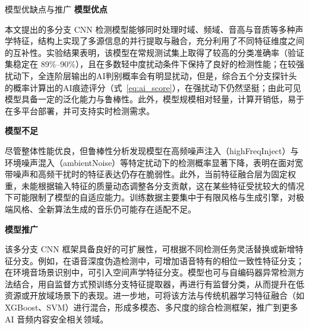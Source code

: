 \documentclass[aspectratio=169]{beamer}
\providecommand{\paragraph}[1]{\smallskip\textbf{#1}\par}
\begin{document}
\begin{frame}{模型优缺点与推广}
\small
\paragraph{模型优点} 
本文提出的多分支 CNN 检测模型能够同时处理时域、频域、音高与音质等多种声学特征，结构上实现了多源信息的并行提取与融合，充分利用了不同特征维度之间的互补性。实验结果表明，该模型在常规测试集上取得了较高的分类准确率（验证集稳定在 89\%--90\%），且在多数轻中度扰动条件下保持了良好的检测性能；在较强扰动下，全连阶层输出的AI判别概率会有明显扰动，但是，综合五个分支探针头的概率计算出的AI痕迹评分（式~\ref{eq:ai_score}），在强扰动下仍然坚挺；由此可见模型具备一定的泛化能力与鲁棒性。此外，模型规模相对轻量，计算开销低，易于在多平台部署，并可支持实时检测需求。

\paragraph{模型不足} 
尽管整体性能优良，但鲁棒性分析发现模型在高频噪声注入（highFreqInject）与环境噪声混入（ambientNoise）等特定扰动下的检测概率显著下降，表明在面对宽带噪声和高频干扰时的特征表达仍存在脆弱性。此外，当前特征融合层为固定权重，未能根据输入特征的质量动态调整各分支贡献，这在某些特征受扰较大的情况下可能限制了模型的自适应能力。训练数据主要集中于有限风格与生成引擎，对极端风格、全新算法生成的音乐仍可能存在适配不足。

\paragraph{模型推广} 
该多分支 CNN 框架具备良好的可扩展性，可根据不同检测任务灵活替换或新增特征分支。例如，在语音深度伪造检测中，可增加语音特有的相位一致性特征分支；在环境音场景识别中，可引入空间声学特征分支。模型也可与自编码器异常检测方法结合，用自监督方式预训练分支特征提取器，再进行有监督分类，从而提升在低资源或开放域场景下的表现。进一步地，可将该方法与传统机器学习特征融合（如 XGBoost、SVM）进行混合，形成多模态、多尺度的综合检测框架，推广到更多 AI 音频内容安全相关领域。

\appendix
\end{frame}
\end{document}
